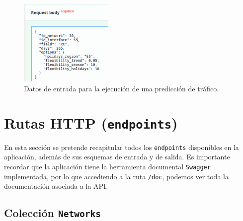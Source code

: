 \documentclass[a4paper, oneside, 12pt]{book}
\begin{document}
	\begin{figure}[h!]
		\begin{center}
			\includegraphics[width=0.4\textwidth]{img/prophet_schema.png}
			\caption{Datos de entrada para la ejecución de una predicción de tráfico.}
			\label{img: prophet schema}
		\end{center}
	\end{figure}

	\pagebreak
	
	\section{Rutas HTTP (\texttt{endpoints})}
	
	\noindent En esta sección se pretende recapitular todos los \texttt{endpoints} disponibles en la aplicación, además de sus esquemas de entrada y de salida. Es importante recordar que la aplicación tiene la herramienta documental \texttt{Swagger} implementada, por lo que accediendo a la ruta \texttt{/doc}, podemos ver toda la documentación asociada a la API.
	
	\subsection{Colección \texttt{Networks}}
	
\end{document}
